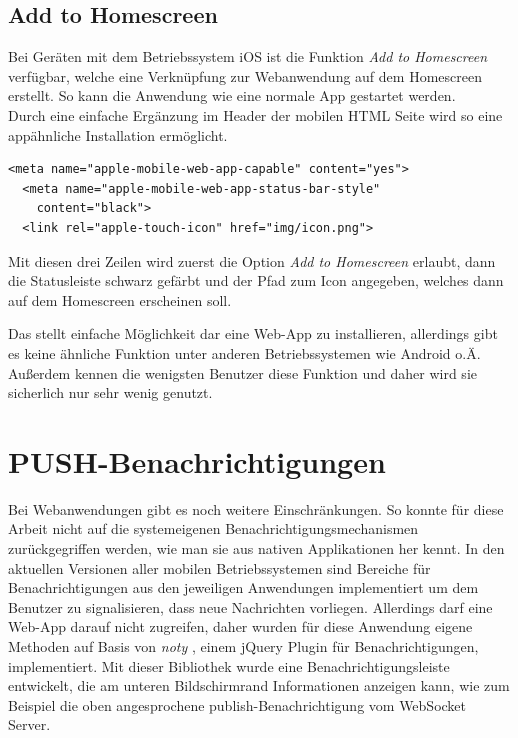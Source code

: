 \subsection{Add to Homescreen}
Bei Geräten mit dem Betriebssystem iOS ist die Funktion \emph{Add to Homescreen} verfügbar, welche eine Verknüpfung zur Webanwendung auf dem Homescreen erstellt. So kann die Anwendung wie eine normale App gestartet werden.\\
Durch eine einfache Ergänzung im Header der mobilen HTML Seite wird so eine appähnliche Installation ermöglicht.
\\
\begin{lstlisting}[captionpos=b, caption=Ergänzung im Header der mobilen Seite]
  <meta name="apple-mobile-web-app-capable" content="yes">
  <meta name="apple-mobile-web-app-status-bar-style"
  	content="black">
  <link rel="apple-touch-icon" href="img/icon.png">
\end{lstlisting}
Mit diesen drei Zeilen wird zuerst die Option \emph{Add to Homescreen} erlaubt, dann die Statusleiste schwarz gefärbt und der Pfad zum Icon angegeben, welches dann auf dem Homescreen erscheinen soll.\par

Das stellt einfache Möglichkeit dar eine Web-App zu installieren, allerdings gibt es keine ähnliche Funktion unter anderen Betriebssystemen wie Android o.Ä. Außerdem kennen die wenigsten Benutzer diese Funktion und daher wird sie sicherlich nur sehr wenig genutzt.


\section{PUSH-Benachrichtigungen}
Bei Webanwendungen gibt es noch weitere Einschränkungen. So konnte für diese Arbeit nicht auf die systemeigenen Benachrichtigungsmechanismen zurückgegriffen werden, wie man sie aus nativen Applikationen her kennt. In den aktuellen Versionen aller mobilen Betriebssystemen sind Bereiche für Benachrichtigungen aus den jeweiligen Anwendungen implementiert um dem Benutzer zu signalisieren, dass neue Nachrichten vorliegen. Allerdings darf eine Web-App darauf nicht zugreifen, daher wurden für diese Anwendung eigene Methoden auf Basis von \emph{noty} \cite{noty}, einem jQuery Plugin für Benachrichtigungen, implementiert. Mit dieser Bibliothek wurde eine Benachrichtigungsleiste entwickelt, die am unteren Bildschirmrand Informationen anzeigen kann, wie zum Beispiel die oben angesprochene publish-Benachrichtigung vom WebSocket Server.\par

